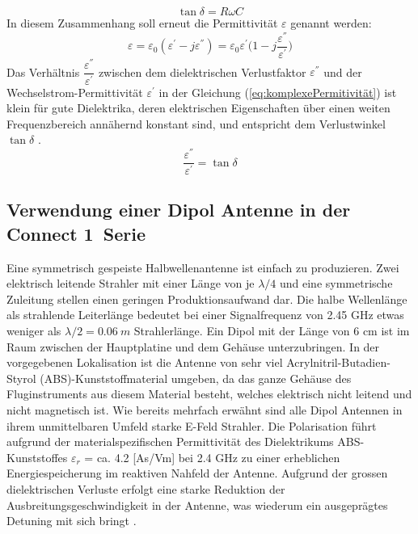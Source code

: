 \begin{equation} \label{eq:VerlustwinkelKondensator}
\tan \delta = R \omega C
\end{equation}
In diesem Zusammenhang soll erneut die Permittivität $\varepsilon$ genannt werden:
\begin{equation} \label{eq:komplexePermitivität}
\varepsilon=\varepsilon_0(\varepsilon^{'}-j\varepsilon^{''})=\varepsilon_0\varepsilon^{'}\big(1-j\dfrac{\varepsilon^{''}}{\varepsilon^{'}}\big)
\end{equation}
Das Verhältnis $\dfrac{\varepsilon^{''}}{\varepsilon^{'}}$ zwischen dem dielektrischen Verlustfaktor $\varepsilon^{''}$ und der Wechselstrom-Permittivität $\varepsilon^{'}$ in der Gleichung (\ref{eq:komplexePermitivität}) ist klein für gute Dielektrika, deren elektrischen Eigenschaften über einen weiten Frequenzbereich annähernd konstant sind, und entspricht dem Verlustwinkel $\tan\delta$ \cite{elliott1981antenna}. 
\begin{equation} \label{eq:VerlustwinkelEpsilonPermitivität}
\dfrac{\varepsilon^{''}}{\varepsilon^{'}}=\tan\delta
\end{equation}
\newpage

\subsection{Verwendung einer Dipol Antenne in der \glqq Connect 1\grqq \ Serie}
Eine symmetrisch gespeiste Halbwellenantenne ist einfach zu produzieren. Zwei elektrisch leitende Strahler mit  einer Länge von je $\lambda/4$ und eine symmetrische Zuleitung stellen einen geringen Produktionsaufwand dar. Die halbe Wellenlänge als strahlende Leiterlänge bedeutet bei einer Signalfrequenz von 2.45 GHz etwas weniger als $\lambda/2=0.06\  m$ Strahlerlänge. Ein Dipol mit der Länge von 6 cm ist im Raum zwischen der Hauptplatine und dem Gehäuse unterzubringen. 
In der vorgegebenen Lokalisation ist die Antenne von sehr viel Acrylnitril-Butadien-Styrol (ABS)-Kunststoffmaterial umgeben, da das ganze Gehäuse des Fluginstruments aus diesem Material besteht, welches elektrisch nicht leitend und nicht magnetisch ist. Wie bereits mehrfach erwähnt sind alle Dipol Antennen in ihrem unmittelbaren Umfeld starke E-Feld Strahler. Die Polarisation führt aufgrund der materialspezifischen Permittivität des Dielektrikums ABS-Kunststoffes $\varepsilon_r$ = ca. 4.2 [As/Vm] bei 2.4 GHz zu einer erheblichen Energiespeicherung im reaktiven Nahfeld der Antenne. Aufgrund der grossen dielektrischen Verluste erfolgt eine starke Reduktion der Ausbreitungsgeschwindigkeit in der Antenne, was wiederum ein ausgeprägtes Detuning mit sich bringt \cite{WikiPermitt}.\\

